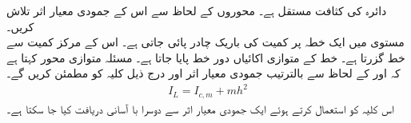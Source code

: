 دائرہ   کی کثافت مستقل ہے۔ محوروں کے لحاظ سے اس کے جمودی معیار اثر تلاش کریں۔ 
\\
مستوی  میں  ایک خطہ  پر  کمیت  کی باریک چادر پائی جاتی ہے۔ اس کے مرکز کمیت سے خط   گزرتا ہے۔ خط  کے متوازی    اکائیاں دور خط  پایا جاتا ہے۔ مسئلہ متوازی محور کہتا ہے  کہ  اور  کے لحاظ سے  بالترتیب جمودی معیار اثر  اور  درج ذیل کلیہ کو مطمئن کریں گے۔
\begin{align}
I_L=I_{c,m}+mh^2
\end{align}
اس کلیہ کو استعمال کرتے ہوئے ایک جمودی معیار اثر سے دوسرا با آسانی دریافت کیا جا سکتا ہے۔

